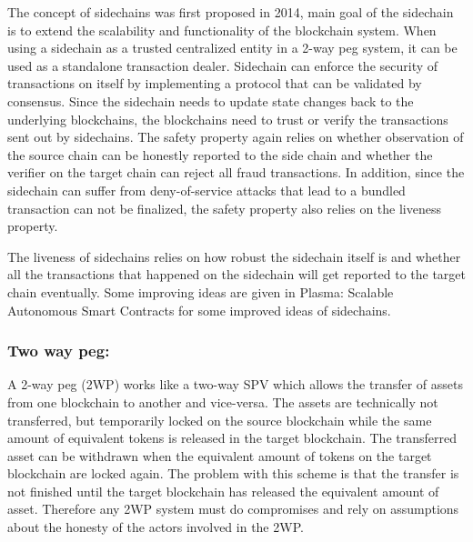 \documentclass[pageno]{jpaper}
\begin{document}
    The concept of sidechains was first proposed in 2014, main goal of the sidechain is to extend the scalability and functionality of the blockchain system. When using a sidechain as a trusted centralized entity in a 2-way peg system, it can be used as a standalone transaction dealer. 
    Sidechain can enforce the security of transactions on itself by implementing a protocol that can be validated by consensus. Since the sidechain needs to update state changes back to the underlying blockchains, the blockchains need to trust or verify the transactions sent out by sidechains. The safety property again relies on whether observation of the source chain can be honestly reported to the side chain and whether the verifier on the target chain can reject all fraud transactions. In addition, since the sidechain can suffer from deny-of-service attacks that lead to a bundled transaction can not be finalized, the safety property also relies on the liveness property.

    The liveness of sidechains relies on how robust the sidechain itself is and whether all the transactions that happened on the sidechain will get reported to the target chain eventually. Some improving ideas are given in Plasma: Scalable Autonomous Smart Contracts for some improved ideas of sidechains.
\\
\subsubsection{Two way peg:}
    A 2-way peg (2WP) works like a two-way SPV which allows the transfer of assets from one blockchain to another and vice-versa. The assets are technically not transferred, but temporarily locked on the source blockchain while the same amount of equivalent tokens is released in the target blockchain. The transferred asset can be withdrawn when the equivalent amount of tokens on the target blockchain are locked again. The problem with this scheme is that the transfer is not finished until the target blockchain has released the equivalent amount of asset. Therefore any 2WP system must do compromises and rely on assumptions about the honesty of the actors involved in the 2WP.
\\
\end{document}
